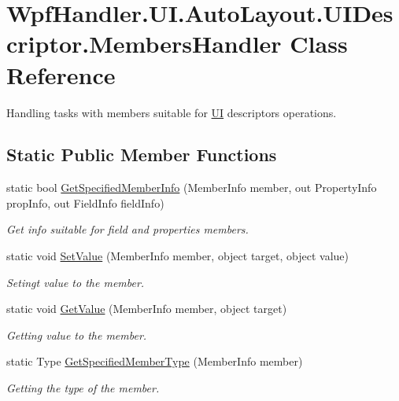 \hypertarget{class_wpf_handler_1_1_u_i_1_1_auto_layout_1_1_u_i_descriptor_1_1_members_handler}{}\section{Wpf\+Handler.\+U\+I.\+Auto\+Layout.\+U\+I\+Descriptor.\+Members\+Handler Class Reference}
\label{class_wpf_handler_1_1_u_i_1_1_auto_layout_1_1_u_i_descriptor_1_1_members_handler}


Handling tasks with members suitable for \mbox{\hyperlink{namespace_wpf_handler_1_1_u_i}{UI}} descriptor\textquotesingle{}s operations.  


\subsection*{Static Public Member Functions}
\begin{DoxyCompactItemize}
\item 
static bool \mbox{\hyperlink{class_wpf_handler_1_1_u_i_1_1_auto_layout_1_1_u_i_descriptor_1_1_members_handler_ab01eefa74f07555d76c813ac0f104b54}{Get\+Specified\+Member\+Info}} (Member\+Info member, out Property\+Info prop\+Info, out Field\+Info field\+Info)
\begin{DoxyCompactList}\small\item\em Get info suitable for field and properties members. \end{DoxyCompactList}\item 
static void \mbox{\hyperlink{class_wpf_handler_1_1_u_i_1_1_auto_layout_1_1_u_i_descriptor_1_1_members_handler_a1bd9d1aaca70397519f3043059bebb63}{Set\+Value}} (Member\+Info member, object target, object value)
\begin{DoxyCompactList}\small\item\em Setingt value to the member. \end{DoxyCompactList}\item 
static void \mbox{\hyperlink{class_wpf_handler_1_1_u_i_1_1_auto_layout_1_1_u_i_descriptor_1_1_members_handler_a3bf47759ce16ab35678709a5ddf121f6}{Get\+Value}} (Member\+Info member, object target)
\begin{DoxyCompactList}\small\item\em Getting value to the member. \end{DoxyCompactList}\item 
static Type \mbox{\hyperlink{class_wpf_handler_1_1_u_i_1_1_auto_layout_1_1_u_i_descriptor_1_1_members_handler_a0a6dfae144a9878366a3b81ef52b7145}{Get\+Specified\+Member\+Type}} (Member\+Info member)
\begin{DoxyCompactList}\small\item\em Getting the type of the member. \end{DoxyCompactList}\end{DoxyCompactItemize}


